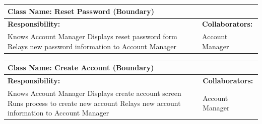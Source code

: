 \documentclass[]{article}
\begin{document}
	\begin{table}[H]
	    \centering
	    \begin{tabular}{|p{7cm}|p{7cm}|}
	    \hline 
	     \multicolumn{2}{|l|}{\textbf{Class Name: Reset Password (Boundary)}} \\
	    \hline
	    \textbf{Responsibility:} & \textbf{Collaborators:} \\
	    \hline
	    Knows Account Manager \newline
		Displays reset password form \newline 
		Relays new password information to Account Manager & 		
	    Account Manager \\
	    \hline
	    \end{tabular}
	\end{table}

	\begin{table}[H]
	    \centering
	    \begin{tabular}{|p{7cm}|p{7cm}|}
	    \hline 
	     \multicolumn{2}{|l|}{\textbf{Class Name: Create Account (Boundary)}} \\
	    \hline
	    \textbf{Responsibility:} & \textbf{Collaborators:} \\
	    \hline
		Knows Account Manager \newline
		Displays create account screen \newline
		Runs process to create new account \newline 
		Relays new account information to Account Manager & 		
	    Account Manager \\
	    \hline
	    \end{tabular}
	\end{table}
	
\FloatBarrier

\appendix
\end{document}
